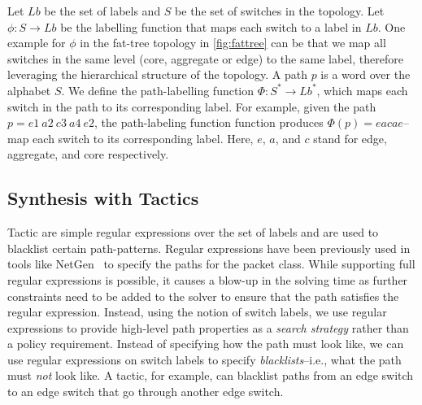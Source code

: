  Let $Lb$ be the set of labels and $S$ be the set of switches in the topology. Let $\phi : S \rightarrow Lb$ be the labelling function that maps each switch to a label in $Lb$. One example for $\phi$ in the fat-tree topology in \cref{fig:fattree} can be that we map all switches in the same level (core, aggregate or edge) to the same label,
therefore leveraging the hierarchical structure of the topology. A path $p$ is a word over the alphabet $S$. 
We define the path-labelling function $\Phi : S^* \rightarrow Lb^*$,  which maps each switch in the path to its corresponding 
 label. 
 For example, given the path $p = e1\ a2\ c3\ a4\ e2$, the path-labeling function function produces $\Phi(p) = eacae$--map each switch to its corresponding label.
 Here, $e$, $a$, and $c$ stand for edge, aggregate, and core respectively.

\subsection{Synthesis with Tactics}
Tactic are simple regular expressions over the set of labels and are used to blacklist certain path-patterns.
Regular expressions have been previously used in tools like
NetGen~\cite{netgen} to specify the paths for the packet class.
While supporting full regular expressions is possible, it causes a blow-up in the solving time as further
constraints need to be added to the solver to ensure that the path satisfies the regular expression. 
Instead, using the notion of switch labels, we use regular expressions to provide high-level path properties as a {\em search strategy} rather than a policy requirement. Instead of specifying how the path must look like, we can use regular expressions on switch labels to specify \emph{blacklists}--i.e.,
what the path must \emph{not} look like. A tactic, for example, can blacklist paths from an edge switch to an edge switch that go through another edge switch. 
 

